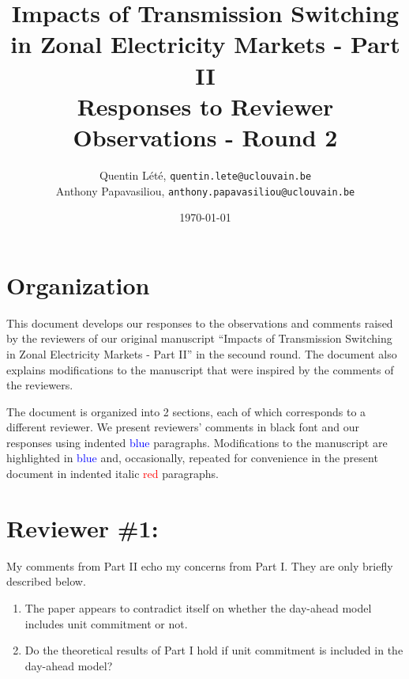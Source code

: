 \documentclass[a4paper,11pt]{article}
\title{Impacts of Transmission Switching in Zonal Electricity Markets - Part II \\[.25cm]
	\Large{Responses to Reviewer Observations - Round 2}}
\author{Quentin Lété, \texttt{quentin.lete@uclouvain.be} \\
	Anthony Papavasiliou, \texttt{anthony.papavasiliou@uclouvain.be}}
\date{\today}
\begin{document}
\maketitle

\section*{Organization}

This document develops our responses to the observations and comments raised by the reviewers of our original manuscript ``Impacts of Transmission Switching in Zonal Electricity Markets - Part II'' in the secound round. The document also explains modifications to the manuscript that were inspired by the comments of the reviewers.

The document is organized into 2 sections, each of which corresponds to a different reviewer. We present reviewers' comments in black font and our responses using indented \textcolor{blue}{blue} paragraphs. Modifications to the manuscript are highlighted in \textcolor{blue}{blue} and, occasionally, repeated for convenience in the present document in indented italic \textcolor{red}{red} paragraphs.

\section{Reviewer \#1:}
My comments from Part II echo my concerns from Part I. They are only briefly described below.


\begin{enumerate}
    \item The paper appears to contradict itself on whether the day-ahead model includes unit commitment or not.
\end{enumerate}


\begin{enumerate}
    \setcounter{enumi}{1}
    \item Do the theoretical results of Part I hold if unit commitment is included in the day-ahead model?
\end{enumerate}

\end{document}
